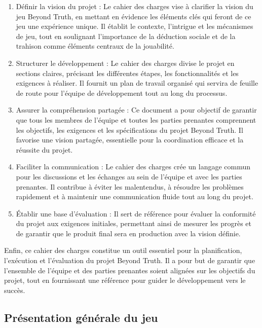 \documentclass[
	article,			%
	11pt,				%
	oneside,			%
	a4paper,			%
	chapter=TITLE,
	french,			%
	sumario=tradicional
	]{base_nt}
\begin{document}
\begin{enumerate}
    \item Définir la vision du projet : Le cahier des charges vise à clarifier la vision du jeu 
    Beyond Truth, en mettant en évidence les éléments clés qui feront de ce jeu une expérience unique. Il établit le contexte, l'intrigue et les mécanismes de jeu, tout en soulignant l'importance de la déduction sociale et de la trahison comme éléments centraux de la jouabilité.

    \item Structurer le développement : Le cahier des charges divise le projet en sections claires, précisant les différentes étapes, les fonctionnalités et les exigences à réaliser. Il fournit un plan de travail organisé qui servira de feuille de route pour l'équipe de développement tout au long du processus.

    \item Assurer la compréhension partagée : Ce document a pour objectif de garantir que tous les membres de l'équipe et toutes les parties prenantes comprennent les objectifs, les exigences et les spécifications du projet Beyond Truth. Il favorise une vision partagée, essentielle pour la coordination efficace et la réussite du projet.

    \item Faciliter la communication : Le cahier des charges crée un langage commun pour les discussions et les échanges au sein de l'équipe et avec les parties prenantes. Il contribue à éviter les malentendus, à résoudre les problèmes rapidement et à maintenir une communication fluide tout au long du projet.

    \item Établir une base d'évaluation : Il sert de référence pour évaluer la conformité du projet aux exigences initiales, permettant ainsi de mesurer les progrès et de garantir que le produit final sera en production avec la vision définie.
    
\end{enumerate}

Enfin, ce cahier des charges constitue un outil essentiel pour la planification, l'exécution et l'évaluation du projet Beyond Truth. Il a pour but de garantir que l'ensemble de l'équipe et des parties prenantes soient alignées sur les objectifs du projet, tout en fournissant une référence pour guider le développement vers le succès.

\subsection{Présentation générale du jeu}
\end{document}
